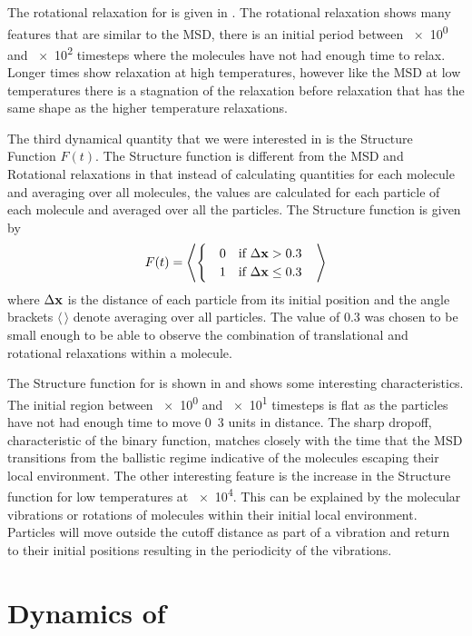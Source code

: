 The rotational relaxation for \sone is given in . The rotational relaxation shows many features that are similar to the MSD, there is an initial period between \num{e0} and \num{e2} timesteps where the molecules have not had enough time to relax. Longer times show relaxation at high temperatures, however like the MSD at low temperatures there is a stagnation of the relaxation before relaxation that has the same shape as the higher temperature relaxations.

The third dynamical quantity that we were interested in is the Structure Function $F(t)$. The Structure function is different from the MSD and Rotational relaxations in that instead of calculating quantities for each molecule and averaging over all molecules, the values are calculated for each particle of each molecule and averaged over all the particles. The Structure function is given by
\begin{align}
    F(t) = \left \langle \begin{cases}
        \quad0 &\text{if } \Delta \mathbf{x} > 0.3 \\
        \quad1 &\text{if } \Delta \mathbf{x} \leq 0.3
    \end{cases} \quad \right \rangle
\end{align}
where $\Delta \mathbf{x}$ is the distance of each particle from its initial position and the angle brackets $\langle\,\rangle$ denote averaging over all particles. The value of \num{0.3} was chosen to be small enough to be able to observe the combination of translational and rotational relaxations within a molecule.

The Structure function for \sone is shown in  and shows some interesting characteristics. The initial region between \num{e0} and \num{e1} timesteps is flat as the particles have not had enough time to move \si{0.3} units in distance. The sharp dropoff, characteristic of the binary function, matches closely with the time that the MSD transitions from the ballistic regime indicative of the molecules escaping their local environment. The other interesting feature is the increase in the Structure function for low temperatures at \num{e4}. This can be explained by the molecular vibrations or rotations of molecules within their initial local environment. Particles will move outside the cutoff distance as part of a vibration and return to their initial positions resulting in the periodicity of the vibrations.

\section{Dynamics of \scon}

